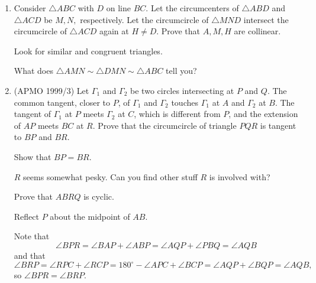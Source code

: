 \begin{enumerate}
\begin{solu}
\begin{addsol}
{    Now note
    \[\angle OCP=\angle ODP=\angle OFP=90^{\circ},\]
    so $OFCPD$ is cyclic. Thus
    \[\angle COP=\angle DOP\]
    \[\angle CFP=\angle DFP.\]}
    \end{addsol}
    \end{solu}
    
    \item Consider $\triangle ABC$ with $D$ on line $BC.$ Let the circumcenters of $\triangle ABD$ and $\triangle ACD$ be $M,N,$ respectively. Let the circumcircle of $\triangle MND$ intersect the circumcircle of $\triangle ACD$ again at $H\neq D.$ Prove that $A,M,H$ are collinear.
    \begin{hint}
    \begin{addhint}
    {Look for similar and congruent triangles.}
    \end{addhint}
    \begin{addhint}
    {What does $\triangle AMN\sim\triangle DMN\sim\triangle ABC$ tell you?}
    \end{addhint}
    \end{hint}
    
    \item (APMO 1999/3) Let $\Gamma_1$ and $\Gamma_2$ be two circles intersecting at $P$ and $Q$. The common tangent, closer to $P$, of $\Gamma_1$ and $\Gamma_2$ touches $\Gamma_1$ at $A$ and $\Gamma_2$ at $B$. The tangent of $\Gamma_1$ at $P$ meets $\Gamma_2$ at $C$, which is different from $P$, and the extension of $AP$ meets $BC$ at $R$.
Prove that the circumcircle of triangle $PQR$ is tangent to $BP$ and $BR$.
    \begin{hint}
    \begin{addhint}
    {Show that $BP=BR.$}
    \end{addhint}
    \begin{addhint}
    {$R$ seems somewhat pesky. Can you find other stuff $R$ is involved with?}
    \end{addhint}
    \begin{addhint}
    {Prove that $ABRQ$ is cyclic.}
    \end{addhint}
    \begin{addhint}
    {Reflect $P$ about the midpoint of $AB.$}
    \end{addhint}
    \end{hint}
    \begin{solu}
    \begin{addsol}
    {Note that
\[\angle BPR=\angle BAP+\angle ABP=\angle AQP+\angle PBQ=\angle AQB\]
and that
\[\angle BRP=\angle RPC+\angle RCP=180^{\circ}-\angle APC+\angle BCP=\angle AQP+\angle BQP=\angle AQB,\]
so $\angle BPR=\angle BRP.$

}
\end{addsol}
\end{solu}
\end{enumerate}
